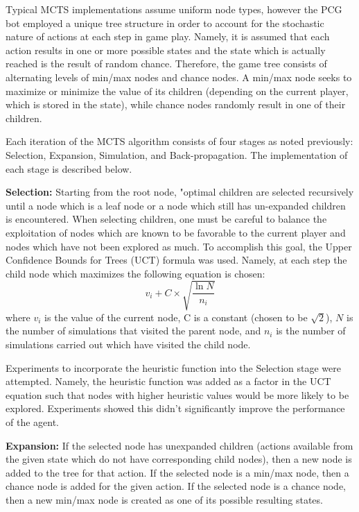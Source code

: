 \documentclass{article}
\begin{document}
Typical MCTS implementations assume uniform node types, however the PCG bot employed a unique tree structure in order to account for the stochastic nature of actions at each step in game play. Namely, it is assumed that each action results in one or more possible states and the state which is actually reached is the result of random chance. Therefore, the game tree consists of alternating levels of min/max nodes and chance nodes. A min/max node seeks to maximize or minimize the value of its children (depending on the current player, which is stored in the state), while chance nodes randomly result in one of their children.

Each iteration of the MCTS algorithm consists of four stages as noted previously: Selection, Expansion, Simulation, and Back-propagation. The implementation of each stage is described below. 

\textbf{Selection:} Starting from the root node, "optimal
 children are selected recursively until a node which is a leaf node or a node which still has un-expanded children is encountered. When selecting children, one must be careful to balance the exploitation of nodes which are known to be favorable to the current player and nodes which have not been explored as much. To accomplish this goal, the Upper Confidence Bounds for Trees (UCT) formula was used. Namely, at each step the child node which maximizes the following equation is chosen: $$v_i + C \times \sqrt{\frac{\ln N}{n_i}}$$ where $v_i$ is the value of the current node, C is a constant (chosen to be $\sqrt{2}$), $N$ is the number of simulations that visited the parent node, and $n_i$ is the number of simulations carried out which have visited the child node. 
 
Experiments to incorporate the heuristic function into the Selection stage were attempted. Namely, the heuristic function was added as a factor in the UCT equation such that nodes with higher heuristic values would be more likely to be explored. Experiments showed this didn't significantly improve the performance of the agent.
 
\textbf{Expansion: } If the selected node has unexpanded children (actions available from the given state which do not have corresponding child nodes), then a new node is added to the tree for that action. If the selected node is a min/max node, then a chance node is added for the given action. If the selected node is a chance node, then a new min/max node is created as one of its possible resulting states.
\end{document}

